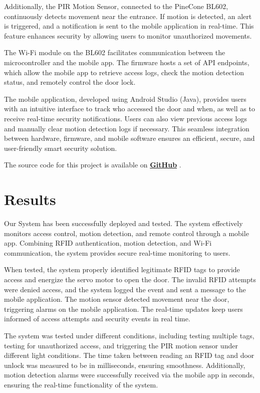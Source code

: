 \documentclass[a4paper]{scrartcl}
\begin{document}
Additionally, the PIR Motion Sensor, connected to the PineCone BL602, continuously detects movement near the entrance. If motion is detected, an alert is triggered, and a notification is sent to the mobile application in real-time. This feature enhances security by allowing users to monitor unauthorized movements.

The Wi-Fi module on the BL602 facilitates communication between the microcontroller and the mobile app. The firmware hosts a set of API endpoints, which allow the mobile app to retrieve access logs, check the motion detection status, and remotely control the door lock.

The mobile application, developed using Android Studio (Java), provides users with an intuitive interface to track who accessed the door and when, as well as to receive real-time security notifications. Users can also view previous access logs and manually clear motion detection logs if necessary. This seamless integration between hardware, firmware, and mobile software ensures an efficient, secure, and user-friendly smart security solution.


The source code for this project is available on \textbf{\href{https://github.com/JOSHUAPBIJU/Smart-Door-Lock-System-based-on-IOT}{GitHub}} \cite{GitHubRepo2025}.


\section{Results}
\label{sec:results} 
Our System has been successfully deployed and tested. The system effectively monitors access control, motion detection, and remote control through a mobile app. Combining RFID authentication, motion detection, and Wi-Fi communication, the system provides secure real-time monitoring to users.

When tested, the system properly identified legitimate RFID tags to provide access and energize the servo motor to open the door. The invalid RFID attempts were denied access, and the system logged the event and sent a message to the mobile application. The motion sensor detected movement near the door, triggering alarms on the mobile application. The real-time updates keep users informed of access attempts and security events in real time.

The system was tested under different conditions, including testing multiple tags, testing for unauthorized access, and triggering the PIR motion sensor under different light conditions. The time taken between reading an RFID tag and door unlock was measured to be in milliseconds, ensuring smoothness. Additionally, motion detection alarms were successfully received via the mobile app in seconds, ensuring the real-time functionality of the system.
\end{document}
